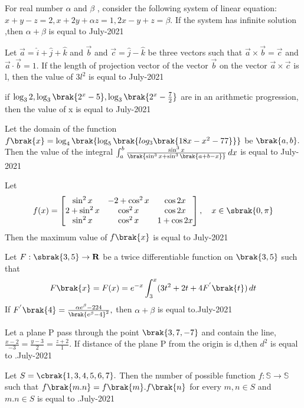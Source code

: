 \iffalse
\title{27-07-2021}
\author{AI24BTECH11032}
\section{integer}
\fi
\item For real number $\alpha$ and $\beta$ , consider the following system of linear equation:
$x+y-z=2,x+2y+\alpha z=1,2x-y+z=\beta.$ If the system has infinite solution ,then $\alpha+\beta$ is equal to \hfill{July-2021}
\item Let $  \overrightarrow{a} = \hat{i} + \hat{j} + \hat{k}
$ and $\overrightarrow{b}$ and $\vec{c} =  \hat{j} - \hat{k}$
 be three vectors such that $\overrightarrow{a} \times \overrightarrow{b}=\overrightarrow{c}$ and $\overrightarrow{a}\cdot \overrightarrow{b} =1.$ If the length of projection vector of the vector $\overrightarrow{b}$ on the vector $\overrightarrow{a} \times \overrightarrow{c}$
 is l, then the value of $3l^{2}$ is equal to \hfill{July-2021}
\item if $\log_3 2, \log_3\brak{2^{x}-5},\log_3\brak{2^{x}-\frac{7}{2}}$ are in an arithmetic progression, then the value of x is equal to \hfill{July-2021}
\item Let the domain of the function $f\brak{x}=\log_4\brak{\log_5\brak{log_3\brak{18x-x^{2}-77}}}$ be $\brak{a,b}.$ Then the value of the integral $\int_{a}^{b} \frac{\sin^{3} x}{\brak{\sin^{3} x + \sin^{3}\brak{a + b - x}}}\, dx$ is equal to \hfill{July-2021}
 \item Let \[
f(x) = \begin{bmatrix}
\sin^{2} x & -2 + \cos^{2} x & \cos 2x \\
2 + \sin^{2} x & \cos^{2}x & \cos 2x \\
\sin^{2} x & \cos^{2} x & 1 + \cos 2x
\end{bmatrix}, \quad x \in \sbrak{0, \pi}
\]
Then the maximum value of $f\brak{x} $ is equal to \hfill{July-2021}
\item Let $F :\sbrak{3, 5} \to \mathbf{R}$ be a twice differentiable function on $\brak{3,5}$ such that \[F\brak{x}=F(x) = e^{-x} \int_{3}^{x} (3t^{2} + 2t + 4F^{'}\brak{t}) \, dt\] If $ F^{'}\brak{4}=\frac{\alpha e^{\beta}-224}{\brak{e^{\beta}-4}^{2}},$ then $\alpha+\beta$ is equal to.\hfill{July-2021}
\item Let a plane P pass through the point $\brak{3,7,-7}$ and contain the line, $\frac{x-2}{-3}=\frac{y-3}{2}=\frac{z+2}{1}.$ If distance of the plane P from the origin is d,then $d^{2}$ is equal to .\hfill{July-2021}
\item  Let $S = \cbrak{1,3,4,5,6,7}.$ Then the number of possible function $f:\mathbb{S}\to \mathbb{S}$ such that $f\brak{m.n}=f\brak{m}.f\brak{n}$ for every $m,n\in S$ and $m.n\in S$ is equal to .\hfill{July-2021}
